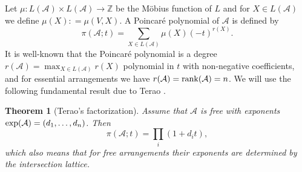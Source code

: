 \documentclass[11pt]{article}
\theoremstyle{plain}
\newtheorem{theorem}[thm]{Theorem}
\theoremstyle{definition}
\begin{document}
Let $\mu : L(\mathcal{A}) \times L(\mathcal{A}) \rightarrow \mathbb{Z}$ be the M\"obius function of $L$ and for $X\in L(\mathcal{A})$  we define $\mu(X) : = \mu(V,X)$. A Poincar\'e polynomial of $\mathcal{A}$ is defined by
$$\pi(\mathcal{A};t) = \sum_{X \in L(\mathcal{A})}\mu(X)(-t)^{r(X)}.$$
It is well-known that the Poincar\'e polynomial is a degree $r(\mathcal{A})= \max_{X\in L(\mathcal{A})} r(X)$ polynomial in $t$ with non-negative coefficients, and for essential arrangements we have $r(\mathcal{A}) = {\rm rank}(\mathcal{A}) = n$. We will use the following fundamental result due to Terao \cite{terao}.
\begin{theorem}[Terao's factorization]
Assume that $\mathcal{A}$ is free with exponents ${\rm exp}(\mathcal{A}) = (d_{1}, \ldots, d_{n})$. Then
$$\pi(\mathcal{A};t) =\prod_{i}(1+d_{i}t),$$
which also means that for free arrangements their exponents are determined by the intersection lattice.
\end{theorem}
\end{document}
